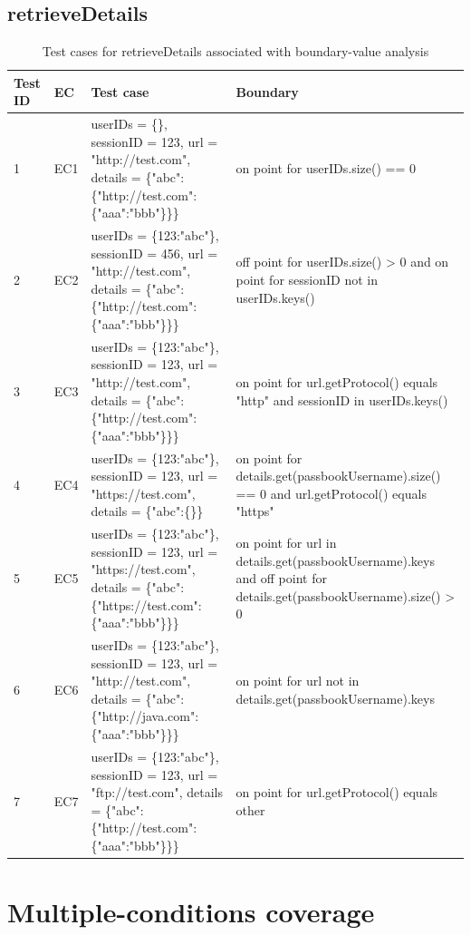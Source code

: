 \documentclass{article}
\begin{document}
\subsection{retrieveDetails}
\begin{longtable}{|p{0.5cm}|p{0.5cm}|p{7cm}|p{5cm}|}
\caption{Test cases for retrieveDetails associated with boundary-value analysis}\\
\hline 
Test ID&EC&Test case&Boundary\\
\hline  
1&EC1&userIDs = \{\}, sessionID = 123, url = "http://test.com", details = \{"abc":\{"http://test.com":\{"aaa":"bbb"\}\}\}&on point for userIDs.size() == 0\\
\hline
2&EC2&userIDs = \{123:"abc"\}, sessionID = 456, url = "http://test.com", details = \{"abc":\{"http://test.com":\{"aaa":"bbb"\}\}\}&off point for userIDs.size() > 0 and on point for sessionID not in userIDs.keys()\\
\hline
3&EC3&userIDs = \{123:"abc"\}, sessionID = 123, url = "http://test.com", details = \{"abc":\{"http://test.com":\{"aaa":"bbb"\}\}\}& on point for url.getProtocol() equals "http" and sessionID in userIDs.keys()\\
\hline
4&EC4&userIDs = \{123:"abc"\}, sessionID = 123, url = "https://test.com", details = \{"abc":\{\}\}&on point for details.get(passbookUsername).size() == 0 and url.getProtocol() equals "https"\\
\hline
5&EC5&userIDs = \{123:"abc"\}, sessionID = 123, url = "https://test.com", details = \{"abc":\{"https://test.com":\{"aaa":"bbb"\}\}\}&on point for url in details.get(passbookUsername).keys and off point for details.get(passbookUsername).size() > 0\\
\hline
6&EC6&userIDs = \{123:"abc"\}, sessionID = 123, url = "http://test.com", details = \{"abc":\{"http://java.com":\{"aaa":"bbb"\}\}\}&on point for url not in details.get(passbookUsername).keys\\
\hline
7&EC7&userIDs = \{123:"abc"\}, sessionID = 123, url = "ftp://test.com", details = \{"abc":\{"http://test.com":\{"aaa":"bbb"\}\}\}&on point for url.getProtocol() equals other\\
\hline
\end{longtable}



\section{Multiple-conditions coverage}
\end{document}
